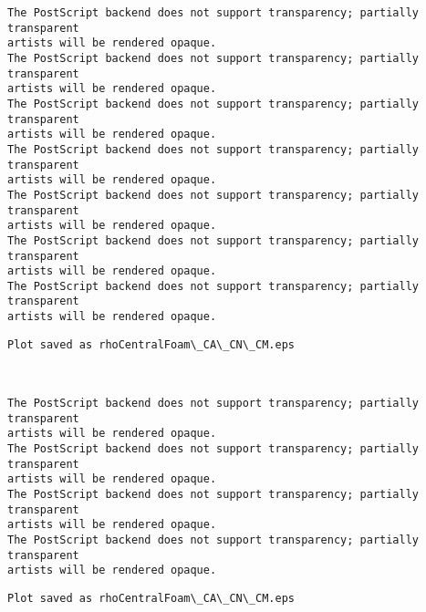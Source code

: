 \documentclass[11pt]{article}
\begin{document}
    \begin{Verbatim}[commandchars=\\\{\}]
The PostScript backend does not support transparency; partially transparent
artists will be rendered opaque.
The PostScript backend does not support transparency; partially transparent
artists will be rendered opaque.
The PostScript backend does not support transparency; partially transparent
artists will be rendered opaque.
The PostScript backend does not support transparency; partially transparent
artists will be rendered opaque.
The PostScript backend does not support transparency; partially transparent
artists will be rendered opaque.
The PostScript backend does not support transparency; partially transparent
artists will be rendered opaque.
The PostScript backend does not support transparency; partially transparent
artists will be rendered opaque.
    \end{Verbatim}

    \begin{Verbatim}[commandchars=\\\{\}]
Plot saved as rhoCentralFoam\_CA\_CN\_CM.eps
    \end{Verbatim}

    \begin{center}
    \end{center}
    { \hspace*{\fill} \\}
    
    \begin{Verbatim}[commandchars=\\\{\}]
The PostScript backend does not support transparency; partially transparent
artists will be rendered opaque.
The PostScript backend does not support transparency; partially transparent
artists will be rendered opaque.
The PostScript backend does not support transparency; partially transparent
artists will be rendered opaque.
The PostScript backend does not support transparency; partially transparent
artists will be rendered opaque.
    \end{Verbatim}

    \begin{Verbatim}[commandchars=\\\{\}]
Plot saved as rhoCentralFoam\_CA\_CN\_CM.eps
    \end{Verbatim}

    \begin{center}
    \end{center}
    { \hspace*{\fill} \\}
    
\end{document}
